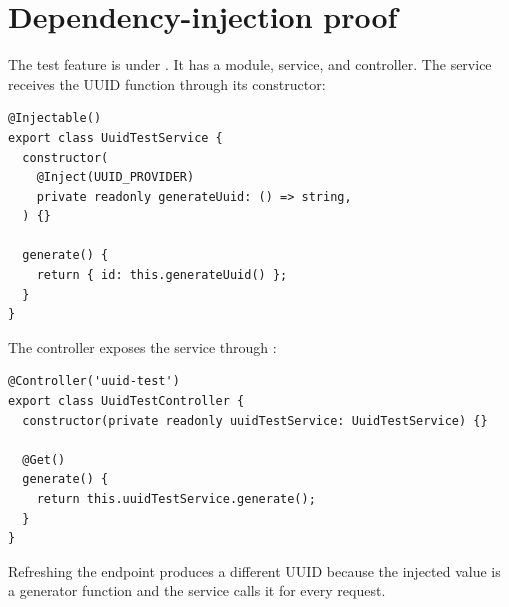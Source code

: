\section{Dependency-injection proof}
The test feature is under . It has a module, service, and controller. The service receives the UUID function through its constructor:
\begin{lstlisting}
@Injectable()
export class UuidTestService {
  constructor(
    @Inject(UUID_PROVIDER)
    private readonly generateUuid: () => string,
  ) {}

  generate() {
    return { id: this.generateUuid() };
  }
}
\end{lstlisting}
The controller exposes the service through :
\begin{lstlisting}
@Controller('uuid-test')
export class UuidTestController {
  constructor(private readonly uuidTestService: UuidTestService) {}

  @Get()
  generate() {
    return this.uuidTestService.generate();
  }
}
\end{lstlisting}
Refreshing the endpoint produces a different UUID because the injected value is a generator function and the service calls it for every request.
\begin{center}\end{center}

